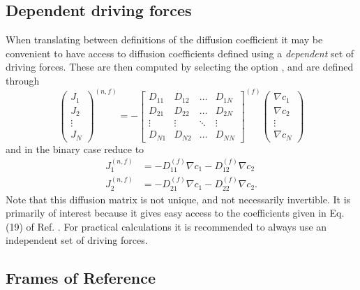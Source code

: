 \subsection{Dependent driving forces}
When translating between definitions of the diffusion coefficient it may be convenient to have access to diffusion coefficients defined using a \textit{dependent} set of driving forces. These are then computed by selecting the option , and are defined through
\begin{equation}
    \begin{pmatrix}J_1 \\ J_2 \\ \vdots \\ J_N \end{pmatrix}^{(n, f)} = -
    \begin{bmatrix}
    D_{11} & D_{12} & \hdots & D_{1N} \\
    D_{21} & D_{22} & \hdots & D_{2N} \\
    \vdots & \vdots & \ddots & \vdots \\
    D_{N1} & D_{N2} & \hdots & D_{NN}
    \end{bmatrix}^{(f)}
    \begin{pmatrix}\nabla c_1 \\ \nabla c_2 \\ \vdots \\ \nabla c_N \end{pmatrix}
\end{equation}
and in the binary case reduce to
\begin{equation}
    \begin{split}
        J_1^{(n, f)} &= - D_{11}^{(f)} \nabla c_1 - D_{12}^{(f)} \nabla c_2 \\
        J_2^{(n, f)} &= - D_{21}^{(f)} \nabla c_1 - D_{22}^{(f)} \nabla c_2.
    \end{split}
\end{equation}
Note that this diffusion matrix is not unique, and not necessarily invertible. It is primarily of interest because it gives easy access to the coefficients given in Eq. (19) of Ref. \cite{retmie}. For practical calculations it is recommended to always use an independent set of driving forces.

\subsection{Frames of Reference}

